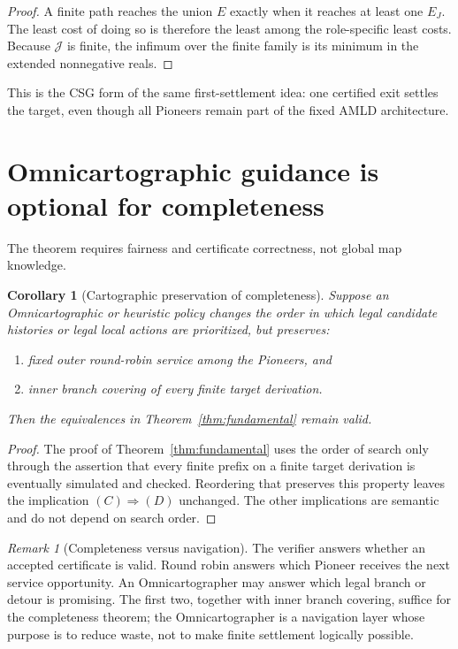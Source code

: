 \documentclass[11pt]{article}
\newtheorem{corollary}[definition]{Corollary}
\theoremstyle{remark}
\newtheorem{remark}[definition]{Remark}
\begin{document}
\begin{proof}
A finite path reaches the union $E$ exactly when it reaches at least one $E_J$.  The least cost of doing so is therefore the least among the role-specific least costs.  Because $\mathcal J$ is finite, the infimum over the finite family is its minimum in the extended nonnegative reals.
\end{proof}

This is the CSG form of the same first-settlement idea: one certified exit settles the target, even though all Pioneers remain part of the fixed AMLD architecture.

\section{Omnicartographic guidance is optional for completeness}

The theorem requires fairness and certificate correctness, not global map knowledge.

\begin{corollary}[Cartographic preservation of completeness]\label{cor:omni}
Suppose an Omnicartographic or heuristic policy changes the order in which legal candidate histories or legal local actions are prioritized, but preserves:
\begin{enumerate}[label=(\alph*)]
\item fixed outer round-robin service among the Pioneers, and
\item inner branch covering of every finite target derivation.
\end{enumerate}
Then the equivalences in Theorem~\ref{thm:fundamental} remain valid.
\end{corollary}

\begin{proof}
The proof of Theorem~\ref{thm:fundamental} uses the order of search only through the assertion that every finite prefix on a finite target derivation is eventually simulated and checked.  Reordering that preserves this property leaves the implication $(C)\Rightarrow(D)$ unchanged.  The other implications are semantic and do not depend on search order.
\end{proof}

\begin{remark}[Completeness versus navigation]
The verifier answers whether an accepted certificate is valid.  Round robin answers which Pioneer receives the next service opportunity.  An Omnicartographer may answer which legal branch or detour is promising.  The first two, together with inner branch covering, suffice for the completeness theorem; the Omnicartographer is a navigation layer whose purpose is to reduce waste, not to make finite settlement logically possible.
\end{remark}
\end{document}
